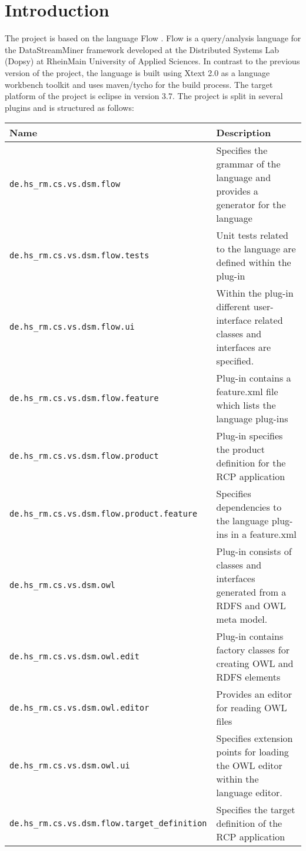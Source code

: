 \section{Introduction}
The project is based on the language Flow \cite{297:Frey2010}. Flow is a 
query/analysis language for the DataStreamMiner framework developed at the 
Distributed Systems Lab (Dopsy) at RheinMain University of Applied Sciences. In 
contrast to the previous version of the project, the language is built using 
Xtext 2.0 as a language workbench toolkit and uses maven/tycho for the build 
process. The target platform of the project is eclipse in version 3.7. The project is split 
in several plugins and is structured as follows:
\begin{center}
  \begin{tabular}{|l|l|}
  \hline
  \textbf{Name} & \textbf{Description} \\
  \hline
  \hline
  \texttt{de.hs\_rm.cs.vs.dsm.flow} & Specifies the grammar of the language and provides a generator for 
  the language \\
  \hline
  \texttt{de.hs\_rm.cs.vs.dsm.flow.tests} &  Unit tests related to the language are defined within the plug-in \\
  \hline
  \texttt{de.hs\_rm.cs.vs.dsm.flow.ui} &  Within the plug-in different user-interface related classes and interfaces are
  specified. \\
  \hline
  \texttt{de.hs\_rm.cs.vs.dsm.flow.feature} & Plug-in contains a feature.xml file which lists the language plug-ins \\
  \hline
  \texttt{de.hs\_rm.cs.vs.dsm.flow.product} & Plug-in specifies the product definition for the RCP application\\
  \hline
  \texttt{de.hs\_rm.cs.vs.dsm.flow.product.feature} & Specifies dependencies to the language plug-ins in a feature.xml\\
  \hline
  \texttt{de.hs\_rm.cs.vs.dsm.owl} & Plug-in consists of classes and interfaces generated from a RDFS and OWL 
  meta model.\\
  \hline
  \texttt{de.hs\_rm.cs.vs.dsm.owl.edit} & Plug-in contains factory classes for creating OWL and RDFS 
  elements \\
  \hline
  \texttt{de.hs\_rm.cs.vs.dsm.owl.editor} & Provides an editor for reading OWL files \\
  \hline
  \texttt{de.hs\_rm.cs.vs.dsm.owl.ui} & Specifies extension points for loading the OWL 
  editor within the language editor. \\
  \hline
  \texttt{de.hs\_rm.cs.vs.dsm.flow.target\_definition} & Specifies the target definition of the RCP application\\
  \end{tabular}
  \label{tab:plug-ins}
\end{center}

